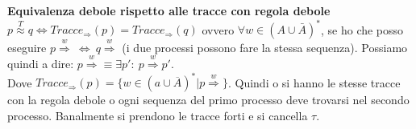 \textbf{Equivalenza debole rispetto alle tracce con regola debole} \\
$p\stackrel{T}{\approx} q \iff Tracce_{\Rightarrow}(p)=Tracce_{\Rightarrow}(q)$ ovvero $\forall w\in(A\cup \bar{A})^*$, se ho che posso eseguire $p\stackrel{w}{\Rightarrow} \ \iff \ q\stackrel{w}{\Rightarrow}$ (i due processi possono fare la stessa sequenza). Possiamo quindi a dire: $p\stackrel{w}{\Rightarrow} \equiv \exists p' : \ p\stackrel{w}{\Rightarrow} p'$. \\
Dove $Tracce_{\Rightarrow}(p)=\{w\in(a\cup \overline{A})^*| p\stackrel{w}{\Rightarrow}\}$.
Quindi o si hanno le stesse tracce con la regola debole o ogni sequenza del primo processo deve trovarsi nel secondo processo. Banalmente si prendono le tracce forti e si cancella $\tau$.